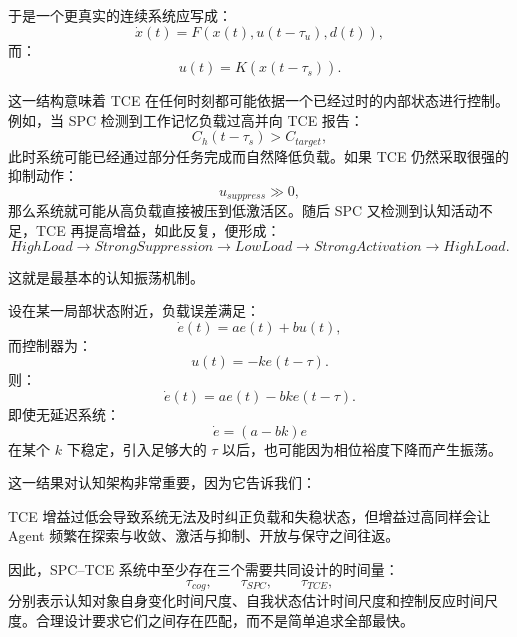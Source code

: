 于是一个更真实的连续系统应写成：
\begin{equation}
\dot{x}(t)
=
F
\left(
x(t),
u(t-\tau_u),
d(t)
\right),
\end{equation}
而：
\begin{equation}
u(t)
=
K
\left(
\hat{x}(t-\tau_s)
\right).
\end{equation}

这一结构意味着 TCE 在任何时刻都可能依据一个已经过时的内部状态进行控制。例如，当 SPC 检测到工作记忆负载过高并向 TCE 报告：
\begin{equation}
C_h(t-\tau_s)>C_{target},
\end{equation}
此时系统可能已经通过部分任务完成而自然降低负载。如果 TCE 仍然采取很强的抑制动作：
\begin{equation}
u_{suppress}\gg0,
\end{equation}
那么系统就可能从高负载直接被压到低激活区。随后 SPC 又检测到认知活动不足，TCE 再提高增益，如此反复，便形成：
\begin{equation}
HighLoad
\rightarrow
StrongSuppression
\rightarrow
LowLoad
\rightarrow
StrongActivation
\rightarrow
HighLoad.
\end{equation}

这就是最基本的认知振荡机制。

设在某一局部状态附近，负载误差满足：
\begin{equation}
\dot e(t)
=
ae(t)+bu(t),
\end{equation}
而控制器为：
\begin{equation}
u(t)
=
-k e(t-\tau).
\end{equation}
则：
\begin{equation}
\dot e(t)
=
ae(t)
-
bk e(t-\tau).
\end{equation}
即使无延迟系统：
\begin{equation}
\dot e=(a-bk)e
\end{equation}
在某个 $k$ 下稳定，引入足够大的 $\tau$ 以后，也可能因为相位裕度下降而产生振荡。

这一结果对认知架构非常重要，因为它告诉我们：
\begin{statementbox}
\centering
{}
\end{statementbox}
TCE 增益过低会导致系统无法及时纠正负载和失稳状态，但增益过高同样会让 Agent 频繁在探索与收敛、激活与抑制、开放与保守之间往返。

因此，SPC--TCE 系统中至少存在三个需要共同设计的时间量：
\begin{equation}
\tau_{cog},
\qquad
\tau_{SPC},
\qquad
\tau_{TCE},
\end{equation}
分别表示认知对象自身变化时间尺度、自我状态估计时间尺度和控制反应时间尺度。合理设计要求它们之间存在匹配，而不是简单追求全部最快。

